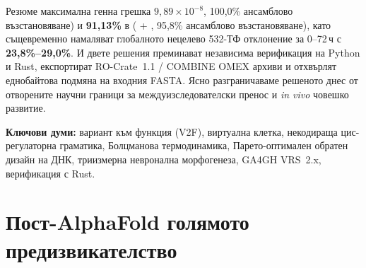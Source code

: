 \documentclass[10.5pt,a4paper]{article}
\begin{document}
\begin{abstractbox}{Резюме}
максимална генна грешка $9{,}89\times10^{-8}$, 100,0\% ансамблово възстановяване) и \textbf{91,13\%} в  ( + , 95,8\% ансамблово възстановяване), като същевременно намаляват глобалното нецелево 532-ТФ отклонение за 0--72\,ч с \textbf{23,8\%--29,0\%}. И двете решения преминават независима верификация на Python и Rust, експортират RO-Crate~1.1 / COMBINE OMEX архиви и отхвърлят еднобайтова подмяна на входния FASTA. Ясно разграничаваме решеното днес от отворените научни граници за междуизследователски пренос и \emph{in vivo} човешко развитие.

\smallskip\noindent\textbf{Ключови думи:} вариант към функция (V2F), виртуална клетка, некодираща цис-регулаторна граматика, Болцманова термодинамика, Парето-оптимален обратен дизайн на ДНК, триизмерна невронална морфогенеза, GA4GH VRS~2.x, верификация с Rust.
\end{abstractbox}

\section{Пост-AlphaFold голямото предизвикателство}
\end{document}
